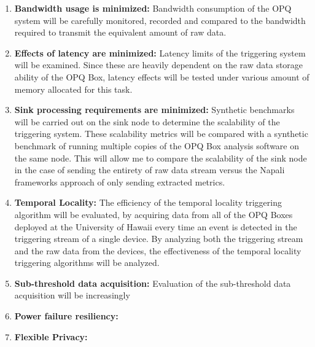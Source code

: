 \begin{enumerate}
  \item \textbf{Bandwidth usage is minimized:} Bandwidth consumption of the OPQ system will be carefully monitored, recorded and compared to the bandwidth required to transmit the equivalent amount of raw data.
    
	\item \textbf{Effects of latency are minimized:}  Latency limits of the triggering system will be examined. Since these are heavily dependent on the raw data storage ability of the OPQ Box, latency effects will be tested under various amount of memory allocated for this task.
  
	\item \textbf{Sink processing requirements are minimized:} Synthetic benchmarks will be carried out on the sink node to determine the scalability of the triggering system. These scalability metrics will be compared with a synthetic benchmark of running multiple copies of the OPQ Box analysis software on the same node. This will allow me to compare the scalability of the sink node in the case of sending the entirety of raw data stream versus the Napali frameworks approach of only sending extracted metrics.
  
  \item \textbf{Temporal Locality:} The efficiency of the temporal locality triggering algorithm will be evaluated, by acquiring data from all of the OPQ Boxes deployed at the University of Hawaii every time an event is detected in the triggering stream of a single device. By analyzing both the triggering stream and the raw data from the devices, the effectiveness of the temporal locality triggering algorithms will be analyzed.

	\item \textbf{Sub-threshold data acquisition:} Evaluation of the sub-threshold data acquisition will be increasingly 
  
	\item \textbf{Power failure resiliency:} 

	\item \textbf{Flexible Privacy:} 

\end{enumerate}

